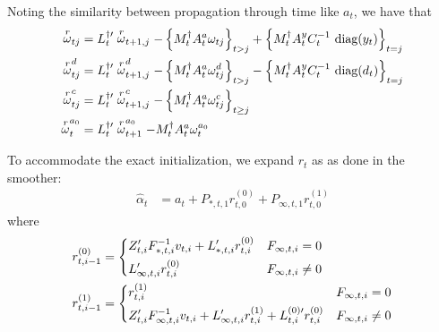 \documentclass[12pt]{article}
\begin{document}
	Noting the similarity between propagation through time like $a_t$, we have that 
	\begin{align*}
	\stackrel{r}{\omega}_{tj} &= L_t^{\dagger\prime} \stackrel{r}{\omega}_{t+1,j} - \left\{ M_t^\dagger A_t^a  \omega_{tj} \right\}_{t>j} + \left\{M_t^\dagger A_t^y C_t^{-1} \text{ diag} (y_t) \right\}_{t=j} \\
	\stackrel{r}{\omega}_{tj}^d &= L_t^{\dagger\prime} \stackrel{r}{\omega}_{t+1,j}^d - \left\{ M_t^\dagger A_t^a \omega_{tj}^d \right\}_{t>j} - \left\{M_t^\dagger A_t^y C_t^{-1} \text{ diag} (d_t) \right\}_{t=j} \\
	\stackrel{r}{\omega}_{tj}^c &= L_t^{\dagger\prime} \stackrel{r}{\omega}_{t+1,j}^c - \left\{ M_t^\dagger A_t^a \omega_{tj}^c \right\}_{t \geq j} \\
	\stackrel{r}{\omega}_{t}^{a_0} &= L_t^{\dagger\prime} \stackrel{r}{\omega}_{t+1}^{a_0} - M_t^\dagger A_t^a \omega_{t}^{a_0} 
	\end{align*}

	To accommodate the exact initialization, we expand $r_t$ as as done in the smoother: 
	\begin{align*}
	\hat{\alpha}_t &= a_t + P_{*,t,1} r_{t,0}^{(0)} + P_{\infty,t,1} r_{t,0}^{(1)}
	\end{align*}
	where
	\begin{align*}
	r_{t,i-1}^{(0)} &= \begin{dcases} 
	   Z_{t,i}^\prime F_{*,t,i}^{-1} v_{t,i} + L_{*,t,i}^\prime r_{t,i}^{(0)} & F_{\infty,t,i} = 0 \\
	   L_{\infty,t,i}^\prime r_{t,i}^{(0)} & F_{\infty,t,i} \neq 0	   
	\end{dcases} \\
	r_{t,i-1}^{(1)} &= \begin{dcases} 
	   r_{t,i}^{(1)} & F_{\infty,t,i} = 0 \\
	   Z_{t,i}^\prime F_{\infty,t,i}^{-1} v_{t,i} + L_{\infty,t,i}^\prime r_{t,i}^{(1)} + L_{t,i}^{(0)\prime} r_{t,i}^{(0)} & F_{\infty,t,i} \neq 0	   
	\end{dcases} 
	\end{align*}
\end{document}

